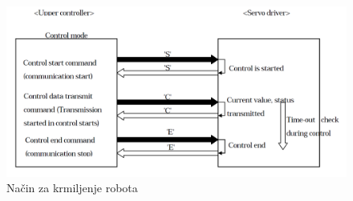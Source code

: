 \begin{figure}
  \includegraphics[width=\linewidth]{./Slike/control_mode.png}
  \caption{Na\v{c}in za krmiljenje robota}
  \label{fig:controlmode}
\end{figure}